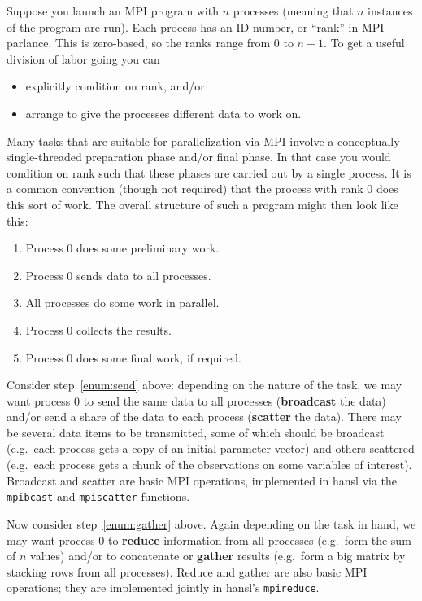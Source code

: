 \documentclass{article}
\begin{document}
Suppose you launch an MPI program with $n$ processes (meaning that $n$
instances of the program are run). Each process has an ID number, or
``rank'' in MPI parlance. This is zero-based, so the ranks range from
0 to $n-1$. To get a useful division of labor going you can
\begin{itemize}
\item explicitly condition on rank, and/or
\item arrange to give the processes different data to work on.
\end{itemize}

Many tasks that are suitable for parallelization via MPI involve a
conceptually single-threaded preparation phase and/or final phase. In
that case you would condition on rank such that these phases are
carried out by a single process. It is a common convention (though not
required) that the process with rank 0 does this sort of work. The
overall structure of such a program might then look like this:
\begin{enumerate}
\item Process 0 does some preliminary work.
\item Process 0 sends data to all processes.\label{enum:send}
\item All processes do some work in parallel.
\item Process 0 collects the results.\label{enum:gather}
\item Process 0 does some final work, if required.
\end{enumerate}

Consider step~\ref{enum:send} above: depending on the nature of the
task, we may want process 0 to send the same data to all processes
(\textbf{broadcast} the data) and/or send a share of the data to each
process (\textbf{scatter} the data).  There may be several data items
to be transmitted, some of which should be broadcast (e.g.\ each
process gets a copy of an initial parameter vector) and others
scattered (e.g.\ each process gets a chunk of the observations on some
variables of interest).  Broadcast and scatter are basic MPI
operations, implemented in hansl via the \texttt{mpibcast} and
\texttt{mpiscatter} functions.

Now consider step~\ref{enum:gather} above. Again depending on the task
in hand, we may want process 0 to \textbf{reduce} information from all
processes (e.g.\ form the sum of $n$ values) and/or to concatenate or
\textbf{gather} results (e.g.\ form a big matrix by stacking rows from
all processes). Reduce and gather are also basic MPI operations; they
are implemented jointly in hansl's \texttt{mpireduce}.
\end{document}
